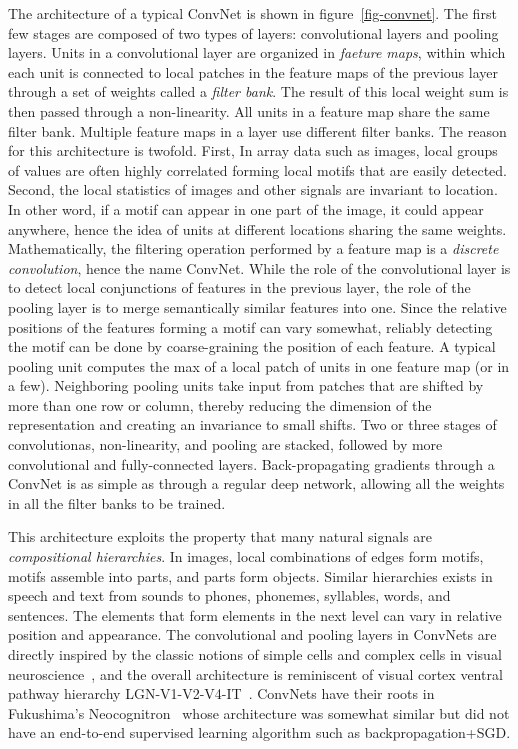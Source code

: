 \documentclass[10pts]{article}
\begin{document}
The architecture of a typical ConvNet is shown in
figure~\ref{fig-convnet}. The first few stages are composed of two
types of layers: convolutional layers and pooling layers. Units in a
convolutional layer are organized in {\em faeture maps}, within which
each unit is connected to local patches in the feature maps of the
previous layer through a set of weights called a {\em filter
  bank}. The result of this local weight sum is then passed through a
non-linearity.  All units in a feature map share the same filter
bank. Multiple feature maps in a layer use different filter banks. The
reason for this architecture is twofold. First, In array data such as
images, local groups of values are often highly correlated forming
local motifs that are easily detected. Second, the local statistics of
images and other signals are invariant to location. In other word, if
a motif can appear in one part of the image, it could appear anywhere,
hence the idea of units at different locations sharing the same
weights.  Mathematically, the filtering operation performed by a
feature map is a {\em discrete convolution}, hence the name
ConvNet. While the role of the convolutional layer is to detect local
conjunctions of features in the previous layer, the role of the
pooling layer is to merge semantically similar features into
one. Since the relative positions of the features forming a motif can
vary somewhat, reliably detecting the motif can be done by
coarse-graining the position of each feature. A typical pooling unit
computes the max of a local patch of units in one feature map (or in a
few). Neighboring pooling units take input from patches that are
shifted by more than one row or column, thereby reducing the dimension
of the representation and creating an invariance to small shifts.  Two
or three stages of convolutionas, non-linearity, and pooling are
stacked, followed by more convolutional and fully-connected layers.
Back-propagating gradients through a ConvNet is as simple
as through a regular deep network, allowing all the weights in all the
filter banks to be trained.

This architecture exploits the property that many natural signals are
{\em compositional hierarchies}. In images, local combinations of
edges form motifs, motifs assemble into parts, and parts form objects.
Similar hierarchies exists in speech and text from sounds to phones,
phonemes, syllables, words, and sentences. The elements that form
elements in the next level can vary in relative position and
appearance. The convolutional and pooling layers in ConvNets are
directly inspired by the classic notions of simple cells and complex
cells in visual neuroscience~\cite{Hubel62}, and the overall
architecture is reminiscent of visual cortex ventral pathway hierarchy
LGN-V1-V2-V4-IT~\cite{VanEssen}. ConvNets have their roots in
Fukushima's Neocognitron~\cite{fukushima-82} whose architecture was
somewhat similar but did not have an end-to-end supervised learning
algorithm such as backpropagation+SGD.
\end{document}
